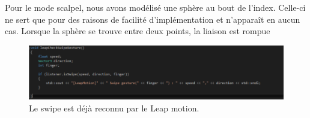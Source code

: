 \documentclass[a4paper,12pt]{article}
\begin{document}
Pour le mode \og{}scalpel\fg{}, nous avons modélisé une sphère au bout de l'index. Celle-ci ne sert que pour des raisons de facilité d'implémentation et n'apparaît en aucun cas. Lorsque la sphère se trouve entre deux points, la liaison est rompue

\begin{figure}
  \centering
  \includegraphics{images/gestes_base2.png}
  \caption{Le swipe est déjà reconnu par le Leap motion.}
  \label{fig:}
\end{figure}
\end{document}
